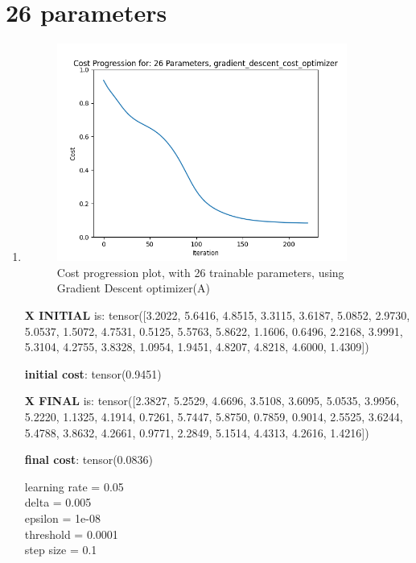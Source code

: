 \documentclass[inscr,ack,preface]{diphdthesis}
\begin{document}
\section{26 parameters}

\begin{enumerate}[label=\textbf{\Alph*.}]
    \item \textbf{ }
    
    \begin{figure}[H]
        \centering
        \includegraphics[width=0.9\textwidth]{26.png}
        \caption{Cost progression plot, with 26 trainable parameters, using Gradient Descent optimizer(A)} 
        \label{fig:fig1}
    \end{figure}
    
    \textbf{X INITIAL} is:
    tensor([3.2022, 5.6416, 4.8515, 3.3115, 3.6187, 5.0852, 2.9730, 5.0537, 1.5072,
            4.7531, 0.5125, 5.5763, 5.8622, 1.1606, 0.6496, 2.2168, 3.9991, 5.3104,
            4.2755, 3.8328, 1.0954, 1.9451, 4.8207, 4.8218, 4.6000, 1.4309])
            
    \textbf{initial cost}: tensor(0.9451)
    
    \textbf{X FINAL} is: 
    tensor([2.3827, 5.2529, 4.6696, 3.5108, 3.6095, 5.0535, 3.9956, 5.2220, 1.1325,
            4.1914, 0.7261, 5.7447, 5.8750, 0.7859, 0.9014, 2.5525, 3.6244, 5.4788,
            3.8632, 4.2661, 0.9771, 2.2849, 5.1514, 4.4313, 4.2616, 1.4216])
    
    \textbf{final cost}: tensor(0.0836)
    
    learning rate =  0.05 \\
    delta =  0.005 \\
    epsilon =  1e-08 \\
    threshold =  0.0001\\ 
    step size =  0.1 \\
    

\end{enumerate}
\end{document}
